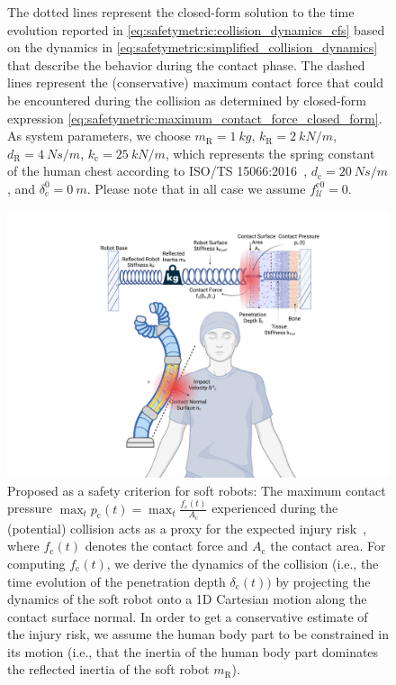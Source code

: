 \begin{figure}[ht]
{        The dotted lines represent the closed-form solution to the time evolution reported in \eqref{eq:safetymetric:collision_dynamics_cfs} based on the dynamics in \eqref{eq:safetymetric:simplified_collision_dynamics} that describe the behavior during the contact phase. The dashed lines represent the (conservative) maximum contact force that could be encountered during the collision as determined by closed-form expression \eqref{eq:safetymetric:maximum_contact_force_closed_form}. 
        As system parameters, we choose $m_\mathrm{R} = \SI{1}{kg}$, $k_\mathrm{R} = \SI{2}{kN \per m}$, $d_\mathrm{R} = \SI{4}{Ns \per m}$, $k_\mathrm{c} = \SI{25}{kN \per m}$, which represents the spring constant of the human chest according to ISO/TS 15066:2016~\citep{iso2016collaborative}, $d_\mathrm{c} = \SI{20}{Ns \per m}$, and $\delta_\mathrm{c}^0 = \SI{0}{m}$.
        Please note that in all case we assume $f_{\mathcal{U}}^{\mathrm{c}0} = 0$.
    }
    \label{fig:safetymetric:closed_form_solution_verification}
\end{figure}

\begin{figure}[h!]
    \centering
    \includegraphics[width=0.65\linewidth]{safetymetric/figures/injury_severity_criterion_illustration.pdf}
    \caption{Proposed  as a safety criterion for soft robots: The maximum contact pressure $\max_t p_\mathrm{c}(t) = \max_t \frac{f_\mathrm{c}(t)}{A_\mathrm{c}}$ experienced during the (potential) collision acts as a proxy for the expected injury risk~\citep{iso2016collaborative}, where $f_\mathrm{c}(t)$ denotes the contact force and $A_\mathrm{c}$ the contact area. For computing $f_\mathrm{c}(t)$, we derive the dynamics of the collision (i.e., the time evolution of the penetration depth $\delta_\mathrm{c}(t))$ by projecting the dynamics of the soft robot onto a 1D Cartesian motion along the contact surface normal. In order to get a conservative estimate of the injury risk, we assume the human body part to be constrained in its motion (i.e., that the inertia of the human body part dominates the reflected inertia of the soft robot $m_\mathrm{R}$).}
    \label{fig:safetymetric:injury_severity_criterion_illustration}
\end{figure}

